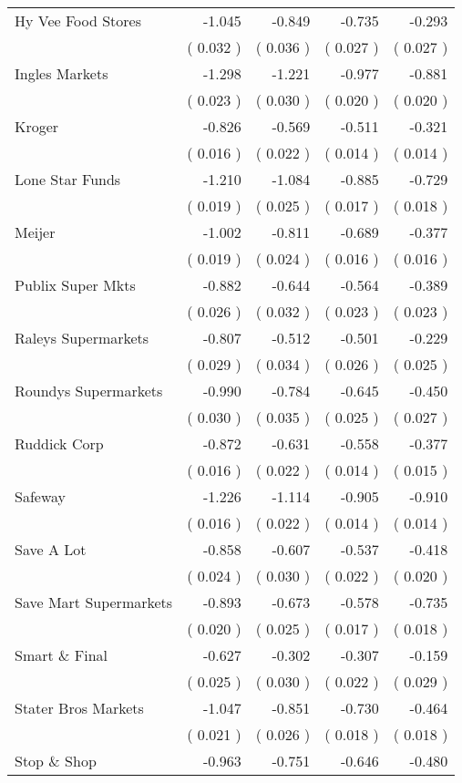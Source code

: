 \begin{table}[htbp]
\begin{tabular}{l*{ 4 }{D{.}{.}{-1}}}
Hy Vee Food Stores  &-1.045 &-0.849 &-0.735 &-0.293 \\ 
& (  0.032 )&(  0.036 )&(  0.027 )&(  0.027 )\\ 
Ingles Markets  &-1.298 &-1.221 &-0.977 &-0.881 \\ 
& (  0.023 )&(  0.030 )&(  0.020 )&(  0.020 )\\ 
Kroger  &-0.826 &-0.569 &-0.511 &-0.321 \\ 
& (  0.016 )&(  0.022 )&(  0.014 )&(  0.014 )\\ 
Lone Star Funds &-1.210 &-1.084 &-0.885 &-0.729 \\ 
& (  0.019 )&(  0.025 )&(  0.017 )&(  0.018 )\\ 
Meijer &-1.002 &-0.811 &-0.689 &-0.377 \\ 
& (  0.019 )&(  0.024 )&(  0.016 )&(  0.016 )\\ 
Publix Super Mkts  &-0.882 &-0.644 &-0.564 &-0.389 \\ 
& (  0.026 )&(  0.032 )&(  0.023 )&(  0.023 )\\ 
Raleys Supermarkets &-0.807 &-0.512 &-0.501 &-0.229 \\ 
& (  0.029 )&(  0.034 )&(  0.026 )&(  0.025 )\\ 
Roundys Supermarkets  &-0.990 &-0.784 &-0.645 &-0.450 \\ 
& (  0.030 )&(  0.035 )&(  0.025 )&(  0.027 )\\ 
Ruddick Corp &-0.872 &-0.631 &-0.558 &-0.377 \\ 
& (  0.016 )&(  0.022 )&(  0.014 )&(  0.015 )\\ 
Safeway  &-1.226 &-1.114 &-0.905 &-0.910 \\ 
& (  0.016 )&(  0.022 )&(  0.014 )&(  0.014 )\\ 
Save A Lot &-0.858 &-0.607 &-0.537 &-0.418 \\ 
& (  0.024 )&(  0.030 )&(  0.022 )&(  0.020 )\\ 
Save Mart Supermarkets &-0.893 &-0.673 &-0.578 &-0.735 \\ 
& (  0.020 )&(  0.025 )&(  0.017 )&(  0.018 )\\ 
Smart \& Final  &-0.627 &-0.302 &-0.307 &-0.159 \\ 
& (  0.025 )&(  0.030 )&(  0.022 )&(  0.029 )\\ 
Stater Bros Markets &-1.047 &-0.851 &-0.730 &-0.464 \\ 
& (  0.021 )&(  0.026 )&(  0.018 )&(  0.018 )\\ 
Stop \& Shop &-0.963 &-0.751 &-0.646 &-0.480 \\ 

\end{tabular}
\end{table}

